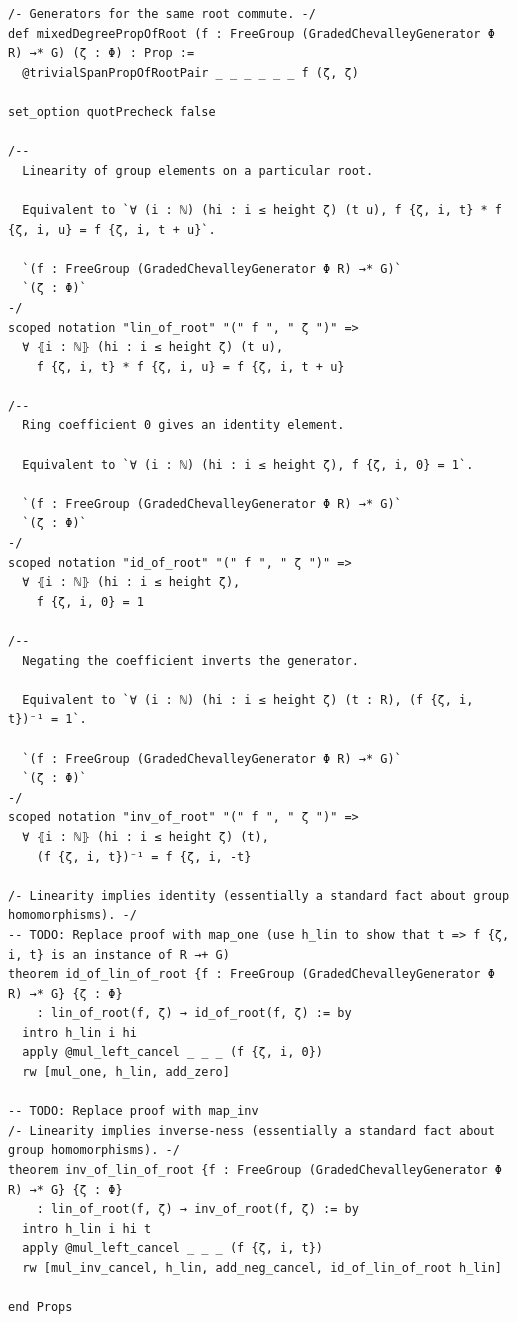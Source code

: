 \documentclass[10pt,a4paper]{article}
\begin{document}
\begin{Verbatim}
/- Generators for the same root commute. -/
def mixedDegreePropOfRoot (f : FreeGroup (GradedChevalleyGenerator Φ R) →* G) (ζ : Φ) : Prop :=
  @trivialSpanPropOfRootPair _ _ _ _ _ _ f (ζ, ζ)

set_option quotPrecheck false

/--
  Linearity of group elements on a particular root.

  Equivalent to `∀ (i : ℕ) (hi : i ≤ height ζ) (t u), f {ζ, i, t} * f {ζ, i, u} = f {ζ, i, t + u}`.

  `(f : FreeGroup (GradedChevalleyGenerator Φ R) →* G)`
  `(ζ : Φ)`
-/
scoped notation "lin_of_root" "(" f ", " ζ ")" =>
  ∀ ⦃i : ℕ⦄ (hi : i ≤ height ζ) (t u),
    f {ζ, i, t} * f {ζ, i, u} = f {ζ, i, t + u}

/--
  Ring coefficient 0 gives an identity element.

  Equivalent to `∀ (i : ℕ) (hi : i ≤ height ζ), f {ζ, i, 0} = 1`.

  `(f : FreeGroup (GradedChevalleyGenerator Φ R) →* G)`
  `(ζ : Φ)`
-/
scoped notation "id_of_root" "(" f ", " ζ ")" =>
  ∀ ⦃i : ℕ⦄ (hi : i ≤ height ζ),
    f {ζ, i, 0} = 1

/--
  Negating the coefficient inverts the generator.

  Equivalent to `∀ (i : ℕ) (hi : i ≤ height ζ) (t : R), (f {ζ, i, t})⁻¹ = 1`.

  `(f : FreeGroup (GradedChevalleyGenerator Φ R) →* G)`
  `(ζ : Φ)`
-/
scoped notation "inv_of_root" "(" f ", " ζ ")" =>
  ∀ ⦃i : ℕ⦄ (hi : i ≤ height ζ) (t),
    (f {ζ, i, t})⁻¹ = f {ζ, i, -t}

/- Linearity implies identity (essentially a standard fact about group homomorphisms). -/
-- TODO: Replace proof with map_one (use h_lin to show that t => f {ζ, i, t} is an instance of R →+ G)
theorem id_of_lin_of_root {f : FreeGroup (GradedChevalleyGenerator Φ R) →* G} {ζ : Φ}
    : lin_of_root(f, ζ) → id_of_root(f, ζ) := by
  intro h_lin i hi
  apply @mul_left_cancel _ _ _ (f {ζ, i, 0})
  rw [mul_one, h_lin, add_zero]

-- TODO: Replace proof with map_inv
/- Linearity implies inverse-ness (essentially a standard fact about group homomorphisms). -/
theorem inv_of_lin_of_root {f : FreeGroup (GradedChevalleyGenerator Φ R) →* G} {ζ : Φ}
    : lin_of_root(f, ζ) → inv_of_root(f, ζ) := by
  intro h_lin i hi t
  apply @mul_left_cancel _ _ _ (f {ζ, i, t})
  rw [mul_inv_cancel, h_lin, add_neg_cancel, id_of_lin_of_root h_lin]

end Props


\end{Verbatim}
\end{document}
